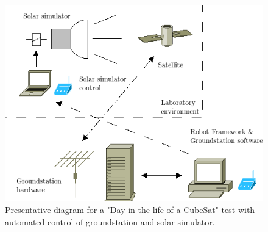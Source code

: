 \documentclass[english,12pt,a4paper,pdftex,elec,utf8]{aaltothesis}
\begin{document}
\begin{figure}[h!]
\centering
\includegraphics[scale=0.6]{dayinlifesetupdiagram}
\caption{Presentative diagram for a "Day in the life of a CubeSat" test with automated control of groundstation and solar simulator.}
\label{dayinlifediagram}
\end{figure}   
  
\end{document}
